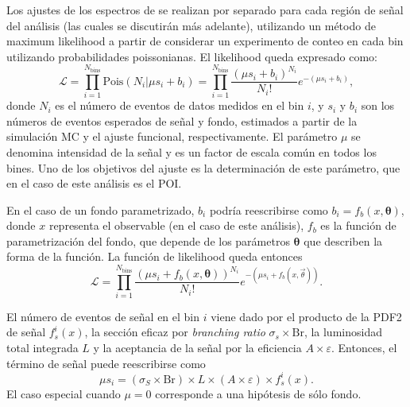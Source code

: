 Los ajustes de los espectros de \myj se realizan por separado para cada región de señal del análisis (las cuales se discutirán más adelante), utilizando un método de maximum likelihood a partir de considerar un experimento de conteo en cada bin utilizando probabilidades poissonianas. El likelihood queda expresado como:
\begin{equation}
    \mathcal{L} = 
    \prod_{i=1}^{N_{\text{bins}}} \text{Pois}\left(N_i | \mu s_i + b_i\right) = 
    \prod_{i=1}^{N_{\text{bins}}} \frac{\left( \mu s_i + b_i \right)^{N_i}}{N_i !} e^{-\left( \mu s_i + b_i \right)},
\end{equation}
donde \(N_i\) es el número de eventos de datos medidos en el bin \(i\), y \(s_i\) y \(b_i\) son los números de eventos esperados de señal y fondo, estimados a partir de la simulación \ac{MC} y el ajuste funcional, respectivamente. El parámetro \(\mu\) se denomina intensidad de la señal y es un factor de escala común en todos los bines. Uno de los objetivos del ajuste es la determinación de este parámetro, que en el caso de este análisis es el \ac{POI}.

En el caso de un fondo parametrizado, \(b_i\) podría reescribirse como \(b_i = f_b\left(x, \mathbf{\theta}\right)\), donde \(x\) representa el observable (\myj en el caso de este análisis), \(f_b\) es la función de parametrización del fondo, que depende de los parámetros \(\mathbf{\theta}\) que describen la forma de la función. La función de likelihood queda entonces
\begin{equation}
    \label{eq:strategy:stat_treatment:stat_model:likelihood}
    \mathcal{L} = 
    \prod_{i=1}^{N_{\text{bins}}} \frac{\left( \mu s_i + f_b \left(x, \mathbf{\theta}\right) \right)^{N_i}}{N_i !} e^{-\left( \mu s_i + f_b \left(x, \vec{\theta}\right) \right)}.
\end{equation}

El número de eventos de señal en el bin \(i\) viene dado por el producto de la \ac{PDF2} de señal \(f_s^i(x)\), la sección eficaz por \textit{branching ratio} \(\sigma_s \times \text{Br}\), la luminosidad total integrada \(L\) y la aceptancia de la señal por la eficiencia \(A \times \varepsilon\). Entonces, el término de señal puede reescribirse como
\begin{equation}
    \label{eq:strategy:stat_treatment:stat_model:mu_si}
    \mu s_i = \left(\sigma_S \times \text{Br} \right) \times L \times \left(A \times \varepsilon\right) \times f_s^i(x).
\end{equation}
El caso especial cuando \(\mu = 0\) corresponde a una hipótesis de sólo fondo.



